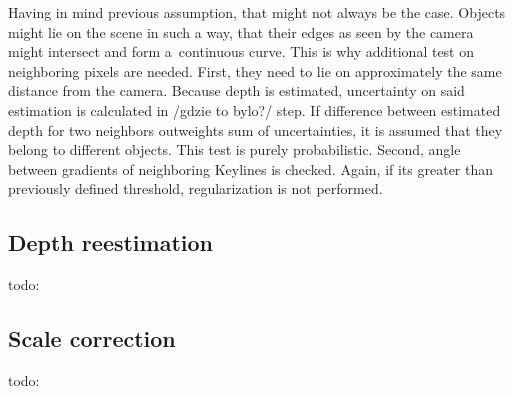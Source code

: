 %
%
%
%

Having in mind previous assumption, that might not always be the case. Objects might lie on the scene in such a way, that their edges as seen by the camera might intersect and form a~continuous curve. This is why additional test on neighboring pixels are needed. First, they need to lie on approximately the same distance from the camera. Because depth is estimated, uncertainty on said estimation is calculated in /gdzie to bylo?/ step. If difference between estimated depth for two neighbors outweights sum of uncertainties, it is assumed that they belong to different objects. This test is purely probabilistic. Second, angle between gradients of neighboring Keylines is checked. Again, if its greater than previously defined threshold, regularization is not performed.

\subsection{Depth reestimation}

 todo:


\subsection{Scale correction}

 
 todo:



